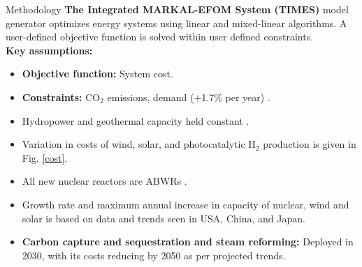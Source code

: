 \documentclass[final]{beamer}
\newlength{\onecolwid}
\newlength{\twocolwid}
\newlength{\threecolwid}
\begin{document}
\begin{frame}[t]
\begin{columns}[t,totalwidth=\threecolwid]
\begin{column}{\twocolwid}
\begin{columns}[t,totalwidth=\twocolwid]


\begin{column}{\onecolwid} %


\begin{block}{Methodology}
        \textbf{The Integrated MARKAL-EFOM System (TIMES)} model generator 
        \cite{loulou_documentation_2005} 
        \cite{seebregts_energy/environmental_2002} optimizes energy systems 
        using linear and mixed-linear algorithms. A user-defined objective 
        function is solved within user defined constraints.\\
\textbf{Key assumptions:}

\begin{itemize}
        \item\textbf{Objective function:} System cost. 
        
         \item\textbf{Constraints:} CO$_2$ emissions, demand (+1.7\% per year) \cite{noauthor_electricity_2017}.
         
         \item Hydropower and geothermal capacity held constant \cite{noauthor_energy_2018}.
         
         \item Variation in costs of wind, solar, and photocatalytic H$_2$ production is given in Fig. \ref{cost}.
         
         \item All new nuclear reactors are ABWRs \cite{rothwell_real_2006}.
         
         \item Growth rate and maximum annual increase in capacity of nuclear, wind and solar is based on data and trends seen in USA, China, and Japan. \cite{noauthor_electricity_2017,noauthor_energy_2018,eia_international_nodate,eia_monthly_2018,iea-pvps_snapshot_2018}
         
         \item \textbf{Carbon capture and sequestration and steam reforming:} Deployed in 2030, with its costs reducing by 2050 as per projected trends. \cite{kato_energy_2016}
         

\end{itemize}
\end{block}
\end{column}
\end{columns}
\end{column}
\end{columns}
\end{frame}
\end{document}
